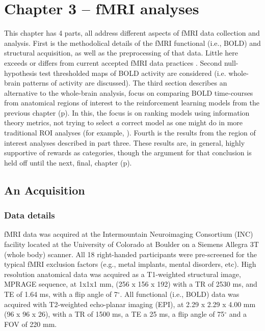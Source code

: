 \section{Chapter 3 -- fMRI analyses} %
\label{sec:task_and_models}
This chapter has 4 parts, all address different aspects of fMRI data collection and analysis.  First is the methodolical details of the fMRI functional (i.e., BOLD) and structural acquisition, as well as the preprocessing of that data.  Little here exceeds or differs from current accepted fMRI data practices \cite{Poldrack:2008p6570,Amaro:2006p2638,Bullmore:1996p6538}.  Second null-hypothesis test thresholded maps of BOLD activity are considered (i.e. whole-brain patterns of activity are discussed).  The third section describes an alternative to the whole-brain analysis, focus on comparing BOLD time-courses from anatomical regions of interest to the reinforcement learning models from the previous chapter (p\pageref{sub:threemodels}).  In this, the focus is on ranking models using information theory metrics, not trying to select \emph{a} correct model as one might do in more traditional ROI analyses (for example, ).  Fourth is the results from the region of interest analyses described in part three.  These results are, in general, highly supportive of rewards as categories, though the argument for that conclusion is held off until the next, final, chapter (p\pageref{sec:dicussion}).

\subsection{An Acquisition}
\label{sub:acquired}
\subsubsection{Data details}
\label{subsub:datadetails}
fMRI data was acquired at the Intermountain Neuroimaging Consortium (INC) facility located at the University of Colorado at Boulder on a Siemens Allegra 3T (whole body) scanner.  All 18 right-handed participants were pre-screened for the typical fMRI exclusion factors (e.g., metal implants, mental disorders, etc).  High resolution anatomical data was acquired as a T1-weighted structural image, MPRAGE sequence, at 1x1x1 mm, (256 x 156 x 192) with a TR of 2530 ms, and TE of 1.64 ms, with a flip angle of 7$^\circ$.  All functional (i.e., BOLD) data was acquired with T2-weighted echo-planar imaging (EPI), at 2.29 x 2.29 x 4.00 mm (96 x 96 x 26), with a TR of 1500 ms, a TE a 25 ms, a flip angle of 75$^\circ$ and a FOV of 220 mm.

